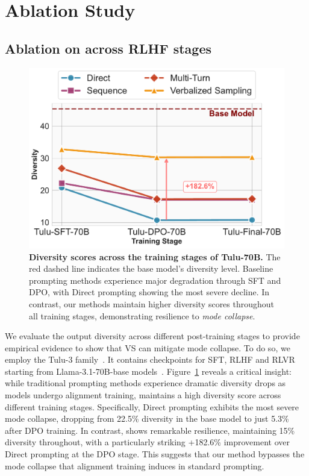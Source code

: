 \section{Ablation Study}

\subsection{Ablation on \ours across RLHF stages}\label{sec:ablation_mitigation} 

\begin{figure}
    \captionsetup{skip=2pt} 
    \vspace{-1.4em}
    \centering
    \includegraphics[width=\linewidth]{figures/creative_writing/poem/ablation/training_progression_diversity.pdf}
    \caption{
    \textbf{Diversity scores across the training stages of Tulu-70B.} The red dashed line indicates the base model's diversity level. Baseline
  prompting methods experience major degradation through SFT and DPO,
  with Direct prompting showing the most severe decline. In contrast, our methods maintain higher
  diversity scores throughout all training stages, demonstrating resilience to \emph{mode collapse}.
  \vspace{-1em}
    }
    \label{fig:training_progression}
\end{figure}
We evaluate the output diversity across different post-training stages to provide empirical evidence to show that VS can mitigate mode collapse. 
%
To do so, we employ the Tulu-3 family~\citep{lambert2025tulu3pushingfrontiers}. It contains checkpoints for SFT, RLHF and RLVR starting from Llama-3.1-70B-base models~\citep{grattafiori2024llama3herdmodels}. Figure~\ref{fig:training_progression} reveals a critical insight: while traditional prompting methods experience dramatic diversity drops as models undergo alignment training, \ours maintains a high diversity score across different training stages. Specifically, Direct prompting exhibits the most severe mode collapse, dropping from 22.5\% diversity in the base model to just 5.3\% after DPO training. In contrast, \ours shows remarkable resilience, maintaining 15\% diversity throughout, with a particularly striking +182.6\% improvement over Direct prompting at the DPO stage. This suggests that our method bypasses the mode collapse that alignment training induces in standard prompting. 

